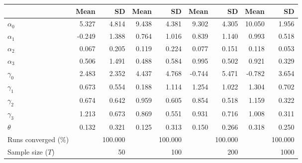 
\begin{tabular}[t]{lrrrrrrrr}
\toprule
  & Mean & SD & Mean  & SD  & Mean   & SD   & Mean    & SD   \\
\midrule
$\alpha_{0}$ & 5.327 & 4.814 & 9.438 & 4.381 & 9.302 & 4.305 & 10.050 & 1.956\\
$\alpha_{1}$ & -0.249 & 1.388 & 0.764 & 1.016 & 0.839 & 1.140 & 0.993 & 0.518\\
$\alpha_{2}$ & 0.067 & 0.205 & 0.119 & 0.224 & 0.077 & 0.151 & 0.118 & 0.053\\
$\alpha_{3}$ & 0.506 & 1.491 & 0.488 & 0.584 & 0.995 & 0.502 & 0.921 & 0.329\\
$\gamma_{0}$ & 2.483 & 2.352 & 4.437 & 4.768 & -0.744 & 5.471 & -0.782 & 3.654\\
$\gamma_{1}$ & 0.673 & 0.554 & 0.188 & 1.114 & 1.254 & 1.022 & 1.304 & 0.702\\
$\gamma_{2}$ & 0.674 & 0.642 & 0.959 & 0.605 & 0.854 & 0.518 & 1.159 & 0.322\\
$\gamma_{3}$ & 1.213 & 0.673 & 0.869 & 0.551 & 0.931 & 0.716 & 1.008 & 0.311\\
$\theta$ & 0.132 & 0.321 & 0.125 & 0.313 & 0.150 & 0.266 & 0.318 & 0.250\\
Runs converged (\%) &  & 100.000 &  & 100.000 &  & 100.000 &  & 100.000\\
Sample size ($T$) &  & 50 &  & 100 &  & 200 &  & 1000\\
\bottomrule
\end{tabular}
